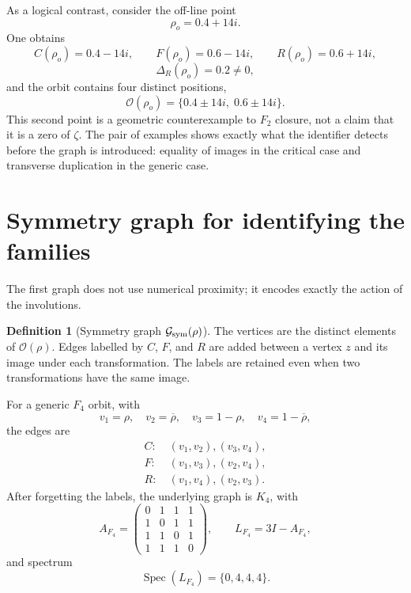 \documentclass[11pt]{amsart}
\theoremstyle{definition}
\newtheorem{definition}[theorem]{Definition}
\theoremstyle{remark}
\begin{document}
As a logical contrast, consider the off-line point
\[
\rho_o=0.4+14i.
\]
One obtains
\[
C(\rho_o)=0.4-14i,\qquad F(\rho_o)=0.6-14i,\qquad R(\rho_o)=0.6+14i,
\]
\[
\Delta_R(\rho_o)=0.2\neq0,
\]
and the orbit contains four distinct positions,
\[
\mathcal O(\rho_o)=\{0.4\pm14i,\;0.6\pm14i\}.
\]
This second point is a geometric counterexample to $F_2$ closure, not a claim that it is a zero of $\zeta$. The pair of examples shows exactly what the identifier detects before the graph is introduced: equality of images in the critical case and transverse duplication in the generic case.

\section{Symmetry graph for identifying the families}
The first graph does not use numerical proximity; it encodes exactly the action of the involutions.

\begin{definition}[Symmetry graph $\mathcal G_{\rm sym}(\rho)$]
The vertices are the distinct elements of $\mathcal O(\rho)$. Edges labelled by $C$, $F$, and $R$ are added between a vertex $z$ and its image under each transformation. The labels are retained even when two transformations have the same image.
\end{definition}

For a generic $F_4$ orbit, with
\[
v_1=\rho,\quad v_2=\overline\rho,\quad v_3=1-\rho,\quad v_4=1-\overline\rho,
\]
the edges are
\begin{align*}
C:&\ (v_1,v_2),(v_3,v_4),\\
F:&\ (v_1,v_3),(v_2,v_4),\\
R:&\ (v_1,v_4),(v_2,v_3).
\end{align*}
After forgetting the labels, the underlying graph is $K_4$, with
\begin{equation}
A_{F_4}=\begin{pmatrix}
0&1&1&1\\1&0&1&1\\1&1&0&1\\1&1&1&0
\end{pmatrix},\qquad
L_{F_4}=3I-A_{F_4},
\end{equation}
and spectrum
\begin{equation}
 \operatorname{Spec}(L_{F_4})=\{0,4,4,4\}.
\end{equation}
\end{document}
